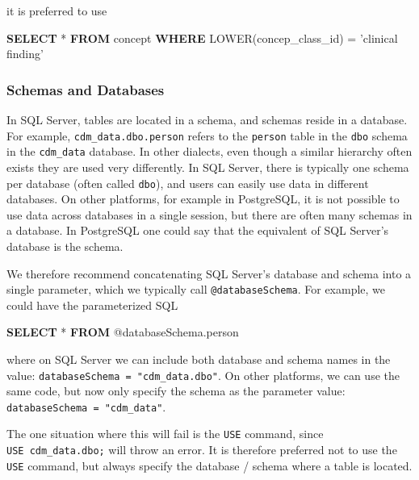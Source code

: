 \documentclass[11pt]{book}
\newenvironment{Shaded}{\begin{snugshade}}{\end{snugshade}}
\newcommand{\KeywordTok}[1]{\textcolor[rgb]{0.13,0.29,0.53}{\textbf{#1}}}
\newcommand{\StringTok}[1]{\textcolor[rgb]{0.31,0.60,0.02}{#1}}
\newcommand{\FunctionTok}[1]{\textcolor[rgb]{0.00,0.00,0.00}{#1}}
\newcommand{\NormalTok}[1]{#1}
\theoremstyle{definition}
\theoremstyle{definition}
\theoremstyle{definition}
\theoremstyle{remark}
\begin{document}
it is preferred to use

\begin{Shaded}
\begin{Highlighting}[]
\KeywordTok{SELECT}\NormalTok{ * }\KeywordTok{FROM}\NormalTok{ concept }\KeywordTok{WHERE} \FunctionTok{LOWER}\NormalTok{(concep_class_id) = }\StringTok{'clinical finding'}
\end{Highlighting}
\end{Shaded}

\subsubsection*{Schemas and Databases}\label{schemas-and-databases}

In SQL Server, tables are located in a schema, and schemas reside in a
database. For example, \texttt{cdm\_data.dbo.person} refers to the
\texttt{person} table in the \texttt{dbo} schema in the
\texttt{cdm\_data} database. In other dialects, even though a similar
hierarchy often exists they are used very differently. In SQL Server,
there is typically one schema per database (often called \texttt{dbo}),
and users can easily use data in different databases. On other
platforms, for example in PostgreSQL, it is not possible to use data
across databases in a single session, but there are often many schemas
in a database. In PostgreSQL one could say that the equivalent of SQL
Server's database is the schema.

We therefore recommend concatenating SQL Server's database and schema
into a single parameter, which we typically call
\texttt{@databaseSchema}. For example, we could have the parameterized
SQL

\begin{Shaded}
\begin{Highlighting}[]
\KeywordTok{SELECT}\NormalTok{ * }\KeywordTok{FROM}\NormalTok{ @databaseSchema.person}
\end{Highlighting}
\end{Shaded}

where on SQL Server we can include both database and schema names in the
value: \texttt{databaseSchema\ =\ "cdm\_data.dbo"}. On other platforms,
we can use the same code, but now only specify the schema as the
parameter value: \texttt{databaseSchema\ =\ "cdm\_data"}.

The one situation where this will fail is the \texttt{USE} command,
since \texttt{USE\ cdm\_data.dbo;} will throw an error. It is therefore
preferred not to use the \texttt{USE} command, but always specify the
database / schema where a table is located.
\end{document}

